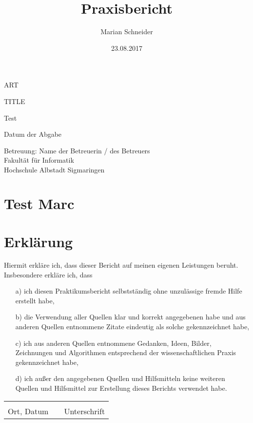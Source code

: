 \documentclass[a4paper, 12pt]{scrartcl}
\title{Praxisbericht}
\author{Marian Schneider}
\date{23.08.2017}
\newcommand{\nameOfCreator}{Test}
\begin{document}
\pagestyle{empty}
	
\begin{titlepage}
	\begin{center} \large 
		    
		ART
		\vspace*{2cm}
		
		{\huge TITLE}
		\vspace*{2.5cm}
		
		\nameOfCreator
		\vspace*{1.5cm}
		
		Datum der Abgabe
		\vspace*{4.5cm}
		
		
		Betreuung: Name der Betreuerin / des Betreuers \\[1cm]
		Fakultät für Informatik \\[1cm]
		Hochschule Albstadt Sigmaringen
		  		
	\end{center}
\end{titlepage}

\section{Test Marc}
	
	
\section{Erklärung}
Hiermit erkläre ich, dass dieser Bericht auf meinen eigenen Leistungen beruht. Insbesondere erkläre ich, dass 
\begin{itemize}
	\item[a)] ich diesen Praktikumsbericht selbstständig ohne unzulässige fremde Hilfe 					  erstellt habe,
	\item[b)] die Verwendung aller Quellen klar und korrekt angegebenen habe und aus 					  anderen Quellen entnommene Zitate eindeutig als solche gekennzeichnet 					  habe,
	\item[c)] ich aus anderen Quellen entnommene Gedanken, Ideen, Bilder, Zeichnungen 					  und Algorithmen entsprechend der wissenschaftlichen Praxis 								  gekennzeichnet habe,
	\item[d)] ich außer den angegebenen Quellen und Hilfsmitteln keine weiteren 						  Quellen und Hilfsmittel zur Erstellung dieses Berichts verwendet habe.
\end{itemize}
\vspace*{1.5cm}
\begin{center}
	\begin{tabular}{lp{2em}l}
		\hspace{3cm} &   & \hspace{3cm} \\\cline{1-1}\cline{3-3}
		Ort, Datum   &   & Unterschrift 
	\end{tabular}
\end{center}
\end{document}
